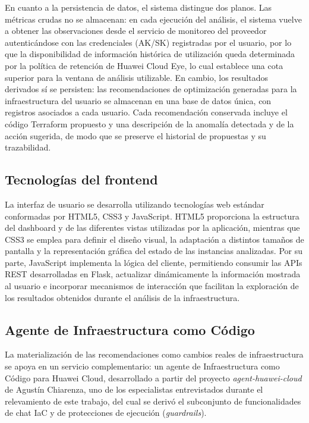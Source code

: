En cuanto a la persistencia de datos, el sistema distingue dos planos.
Las métricas crudas no se almacenan: en cada ejecución del análisis, el
sistema vuelve a obtener las observaciones desde el servicio de
monitoreo del proveedor autenticándose con las credenciales (AK/SK)
registradas por el usuario, por lo que la disponibilidad de información
histórica de utilización queda determinada por la política de retención
de Huawei Cloud Eye, lo cual establece una cota superior para la ventana
de análisis utilizable. En cambio, los resultados derivados sí se
persisten: las recomendaciones de optimización generadas para la
infraestructura del usuario se almacenan en una base de datos única, con
registros asociados a cada usuario. Cada recomendación conservada
incluye el código Terraform propuesto y una descripción de la anomalía
detectada y de la acción sugerida, de modo que se preserve el historial
de propuestas y su trazabilidad.

\subsection{Tecnologías del frontend}

La interfaz de usuario se desarrolla utilizando tecnologías web estándar
conformadas por HTML5, CSS3 y JavaScript. HTML5 proporciona la
estructura del dashboard y de las diferentes vistas utilizadas por la
aplicación, mientras que CSS3 se emplea para definir el diseño visual,
la adaptación a distintos tamaños de pantalla y la representación
gráfica del estado de las instancias analizadas. Por su parte,
JavaScript implementa la lógica del cliente, permitiendo consumir las
APIs REST desarrolladas en Flask, actualizar dinámicamente la
información mostrada al usuario e incorporar mecanismos de interacción
que facilitan la exploración de los resultados obtenidos durante el
análisis de la infraestructura.

\subsection{Agente de Infraestructura como Código}

La materialización de las recomendaciones como cambios reales de infraestructura se apoya en un servicio complementario: un agente de Infraestructura como Código para Huawei Cloud, desarrollado a partir del proyecto \emph{agent-huawei-cloud} de Agustín Chiarenza, uno de los especialistas entrevistados durante el relevamiento de este trabajo, del cual se derivó el subconjunto de funcionalidades de chat IaC y de protecciones de ejecución (\emph{guardrails}).

